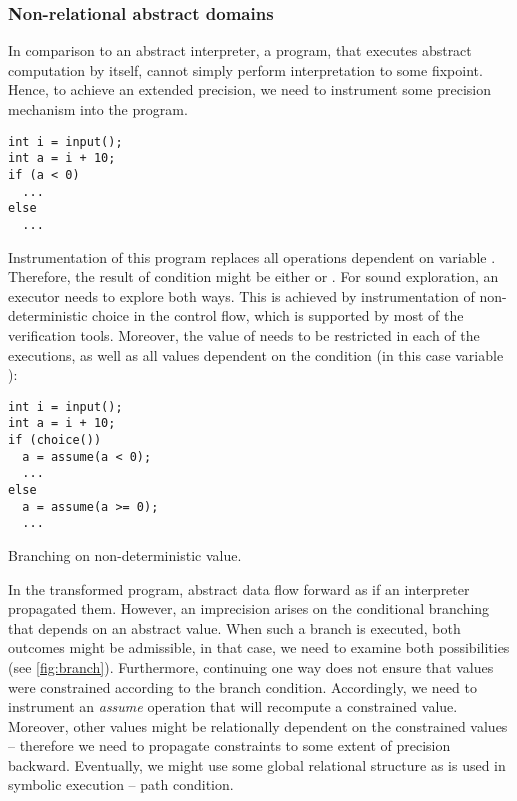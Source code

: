 \subsubsection{Non-relational abstract domains}

In comparison to an abstract interpreter, a program, that executes abstract
computation by itself, cannot simply perform interpretation to some fixpoint. Hence,
to achieve an extended precision, we need to instrument some precision
mechanism into the program.

\begin{marginfigure}
\begin{verbatim}
int i = input();
int a = i + 10;
if (a < 0)
  ...
else
  ...
\end{verbatim}

    \footnotesize
    Instrumentation of this program replaces all operations dependent on variable
    .  Therefore, the result of condition  might be
    either  or .  For sound exploration, an executor
    needs to explore both ways. This is achieved by instrumentation of
    non-deterministic choice in the control flow, which is supported by most of
    the verification tools. Moreover, the value of  needs to be
    restricted in each of the executions, as well as all values dependent on
    the condition (in this case variable ):
\begin{verbatim}
int i = input();
int a = i + 10;
if (choice())
  a = assume(a < 0);
  ...
else
  a = assume(a >= 0);
  ...
\end{verbatim}

\caption{Branching on non-deterministic value.}
\label{fig:branch}
\end{marginfigure}

In the transformed program, abstract data flow forward as if an interpreter
propagated them. However, an imprecision arises on the conditional branching
that depends on an abstract value. When such a branch is executed, both
outcomes might be admissible, in that case, we need to examine both
possibilities (see \autoref{fig:branch}).
Furthermore, continuing one way does not ensure that values were constrained
according to the branch condition. Accordingly, we need to instrument an
\emph{assume} operation that will recompute a constrained value. Moreover,
other values might be relationally dependent on the constrained values --
therefore we need to propagate constraints to some extent of precision
backward. Eventually, we might use some global relational structure as is used
in symbolic execution -- path condition.

